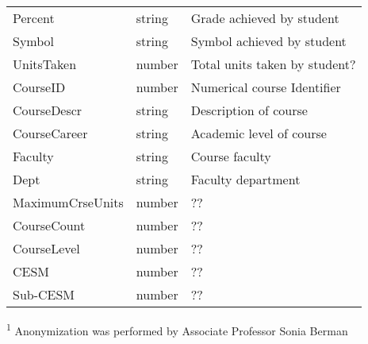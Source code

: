 \begin{table}[H]
\begin{threeparttable}
\begin{tabularx}{\textwidth}{>{\hsize=0.8\hsize}X>{\hsize=0.6\hsize}X>{\hsize=1.6\hsize}X}
            Percent            & string            & Grade achieved by student                            \\
            Symbol             & string            & Symbol achieved by student                           \\
            UnitsTaken         & number            & Total units taken by student?                        \\
            CourseID           & number            & Numerical course Identifier                          \\
            CourseDescr        & string            & Description of course                                \\
            CourseCareer       & string            & Academic level of course                             \\
            Faculty            & string            & Course faculty                                       \\
            Dept               & string            & Faculty department                                   \\
            MaximumCrseUnits   & number            & ??                                                   \\
            CourseCount        & number            & ??                                                   \\
            CourseLevel        & number            & ??                                                   \\
            CESM               & number            & ??                                                   \\
            Sub-CESM           & number            & ??                                                   \\
            \bottomrule
        \end{tabularx}
        \scriptsize
        \begin{tablenotes}
            \item[\textsuperscript{1}]Anonymization was performed by Associate Professor Sonia Berman
        \end{tablenotes}
    \end{threeparttable}
\end{table}